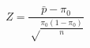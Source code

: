 \documentclass[10pt]{article}
\begin{document}
\[Z=\frac{\bar{p}-\pi_0}{\sqrt\frac{\pi_0(1-\pi_0)}{n}}\]
\end{document}
